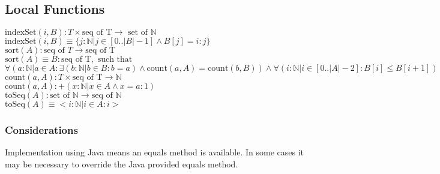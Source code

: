 \documentclass[12pt,fleqn]{examtst}
\begin{document}
\subsection*{Local Functions}

\noindent $\mbox{indexSet}(i, B): T \times \mbox{seq of T}  \rightarrow \mbox{ set of }
\mathbb{N}$\\
\noindent $\mbox{indexSet}(i, B) \equiv \{j: \mathbb{N} | j \in [0..|B|-1]
\wedge B[j] = i : j \}$\\

\noindent $\mbox{sort}(A): \mbox{seq of } T \rightarrow \mbox{seq of T}$\\
\noindent $\mbox{sort}(A) \equiv B: \mbox{seq of T}, \mbox{ such that }$\\
\noindent
$\forall (a: \mathbb{N} | a \in A : \exists(b: \mathbb{N} | b \in B: b = a)
\wedge \mbox{count}(a, A) = \mbox{count}(b, B)) \wedge \forall (i: \mathbb{N} |
i \in [0..|A|-2] : B[i] \leq B[i+1])$\\

\noindent $\mbox{count}(a, A): T \times \mbox{seq of T} \rightarrow \mathbb{N}$\\
\noindent $\mbox{count}(a, A): + (x: \mathbb{N} | x \in A \wedge x = a : 1)$\\

\noindent $\mbox{toSeq}(A): \mbox{set of } \mathbb{N} \rightarrow \mbox{seq of }
\mathbb{N}$\\
\noindent $\mbox{toSeq}(A) \equiv < i: \mathbb{N} | i \in A : i > $

\subsubsection* {Considerations}

Implementation using Java means an equals method is available.  In some cases it
may be necessary to override the Java provided equals method.


\newpage
\end{document}
